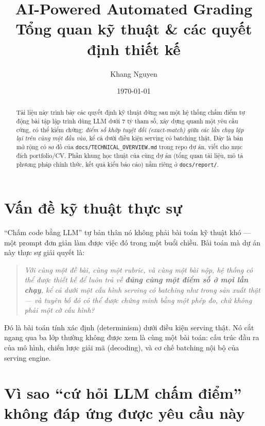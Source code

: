 \documentclass[11pt,a4paper]{article}
\title{\textbf{AI-Powered Automated Grading}\\[2pt]
  \large Tổng quan kỹ thuật \& các quyết định thiết kế}
\author{Khang Nguyen}
\date{\today}
\begin{document}
\maketitle

\begin{abstract}
\noindent Tài liệu này trình bày các quyết định kỹ thuật đứng sau một hệ
thống chấm điểm tự động bài tập lập trình dùng LLM dưới 7 tỷ tham số, xây
dựng quanh một yêu cầu cứng, có thể kiểm chứng: \emph{điểm số khớp tuyệt
đối (exact-match) giữa các lần chạy lặp lại trên cùng một đầu vào}, kể cả
dưới điều kiện serving có batching thật. Đây là bản mở rộng có sơ đồ của
\texttt{docs/TECHNICAL\_OVERVIEW.md} trong repo dự án, viết cho mục đích
portfolio/CV. Phần khung học thuật của cùng dự án (tổng quan tài liệu, mô
tả phương pháp chính thức, kết quả kiểu báo cáo) nằm riêng ở
\texttt{docs/report/}.
\end{abstract}

\tableofcontents
\listoffigures

\section{Vấn đề kỹ thuật thực sự}

``Chấm code bằng LLM'' tự bản thân nó không phải bài toán kỹ thuật khó —
một prompt đơn giản làm được việc đó trong một buổi chiều. Bài toán mà dự
án này thực sự giải quyết là:

\begin{quote}
\itshape Với cùng một đề bài, cùng một rubric, và cùng một bài nộp, hệ
thống có thể được thiết kế để luôn trả về \textbf{đúng cùng một điểm số ở
mọi lần chạy}, kể cả dưới một cấu hình serving có batching như trong sản
xuất thật — và tuyên bố đó có thể được chứng minh bằng một phép đo, chứ
không phải một cờ cấu hình?
\end{quote}

Đó là bài toán tính xác định (determinism) dưới điều kiện serving thật.
Nó cắt ngang qua ba lớp thường không được xem là cùng một bài toán: cấu
trúc đầu ra của mô hình, chiến lược giải mã (decoding), và cơ chế batching
nội bộ của serving engine.

\section{Vì sao ``cứ hỏi LLM chấm điểm'' không đáp ứng được yêu cầu này}
\end{document}
